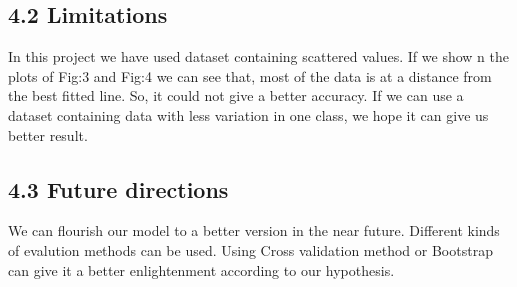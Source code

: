 \documentclass[conference]{IEEEtran}[10]
\begin{document}
\subsection{4.2 Limitations}
In this project we have used dataset containing scattered values. If we show n the plots of Fig:3 and Fig:4 we can see that, most of the data is at a distance from the best fitted line. So, it could not give a better accuracy. If we can use a dataset containing data with less variation in one class, we hope it can give us better result.
\\
\subsection{4.3 Future directions}
We can flourish our model to a better version in the near future. Different kinds of evalution methods can be used. Using Cross validation method or Bootstrap can give it a better enlightenment according to our hypothesis. 


\end{document}
